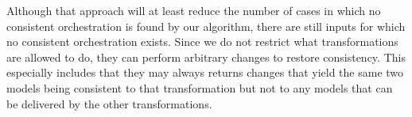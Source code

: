 Although that approach will at least reduce the number of cases in which no consistent orchestration is found by our algorithm, there are still inputs for which no consistent orchestration exists.
Since we do not restrict what transformations are allowed to do, they can perform arbitrary changes to restore consistency.
This especially includes that they may always returns changes that yield the same two models being consistent to that transformation but not to any models that can be delivered by the other transformations.


